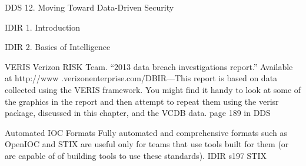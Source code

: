 \documentclass[Screen16to9,17pt]{foils}
\begin{document}
\begin{list1}
\item DDS 12. Moving Toward Data-Driven Security
\begin{list2}
\item
\end{list2}
\end{list1}



\begin{quote}

\end{quote}

\begin{list1}
\item IDIR 1. Introduction
\begin{list2}
\item
\end{list2}
\end{list1}



\begin{quote}

\end{quote}

\begin{list1}
\item IDIR 2. Basics of Intelligence
\begin{list2}
\item
\end{list2}
\end{list1}





\begin{list1}
\item
\end{list1}


VERIS
Verizon RISK Team. “2013 data breach investigations report.” Available at http://www
.verizonenterprise.com/DBIR—This report is based on data collected using the VERIS
framework. You might find it handy to look at some of the graphics in the report and then attempt
to repeat them using the verisr package, discussed in this chapter, and the VCDB data.
page 189 in DDS


Automated IOC Formats
Fully automated and comprehensive formats such as OpenIOC and STIX are useful
only for teams that use tools built for them (or are capable of of building tools to use
these standards).
IDIR s197 STIX






\slidenext{}
\end{document}
